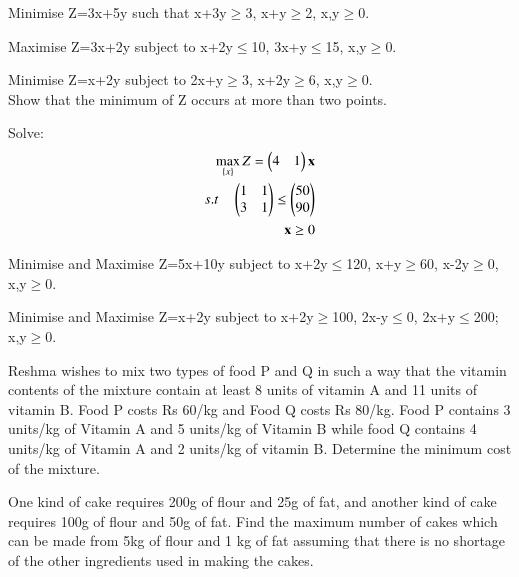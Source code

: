\solution

\item Minimise Z=3x+5y
such that x+3y$\geq$3, x+y$\geq$2, x,y$\geq$0.\\
\item Maximise Z=3x+2y
subject to x+2y$\leq$10, 3x+y$\leq$15, x,y$\geq$0.\\
\solution

\item Minimise Z=x+2y
subject to 2x+y$\geq$3, x+2y$\geq$6, x,y$\geq$0.\\
Show that the minimum of Z occurs at more than two points.\\
\solution

\item Solve:
\begin{align}
    \max_{\{x\}} Z=\myvec{4 & 1}\vec{x}\label{eq:solutions/4/38/eq:1}\\
    s.t\quad \myvec{1 & 1\\3 & 1} \leq \myvec{50\\90}\label{eq:solutions/4/38/eq:2}\\
    \Vec{x}\geq 0 \label{eq:solutions/4/38/eq:3}
\end{align}
\solution

\item Minimise and Maximise Z=5x+10y
subject to x+2y$\leq$120, x+y$\geq$60, x-2y$\geq$0, x,y$\geq$0.\\
\solution

\item Minimise and Maximise Z=x+2y
subject to x+2y$\geq$100, 2x-y$\leq$0, 2x+y$\leq$200; x,y$\geq$0.\\
\solution

\item Reshma wishes to mix two types of food P and Q in such a way that the vitamin
contents of the mixture contain at least 8 units of vitamin A and 11 units of
vitamin B. Food P costs Rs 60/kg and Food Q costs Rs 80/kg. Food P contains
3 units/kg of Vitamin A and 5 units/kg of Vitamin B while food Q contains
4 units/kg of Vitamin A and 2 units/kg of vitamin B. Determine the minimum cost
of the mixture.\\
\solution


\item One kind of cake requires 200g of flour and 25g of fat, and another kind of cake
requires 100g of flour and 50g of fat. Find the maximum number of cakes which
can be made from 5kg of flour and 1 kg of fat assuming that there is no shortage
of the other ingredients used in making the cakes.\\
\solution


